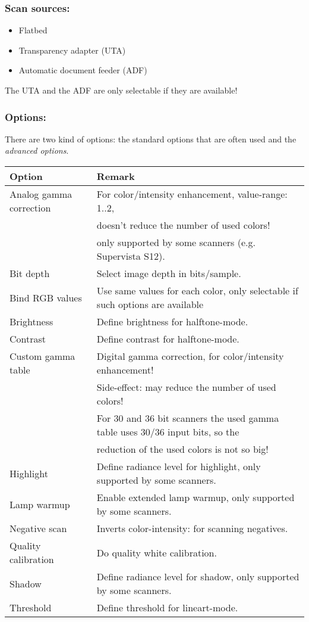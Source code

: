 \subsubsection{Scan sources:}

\begin{itemize}
\item Flatbed
\item Transparency adapter (UTA)
\item Automatic document feeder (ADF)
\end{itemize}
The UTA and the ADF are only selectable if they are available!


\subsubsection{Options:}

There are two kind of options: the standard options that are often used
and the \emph{advanced options}.\\

 \begin{figure}[h]
   \centerline{ \epsfxsize=5cm }
 \end{figure}

\small
\begin{tabular}{|l|l|}
\hline
Option&Remark\\
\hline
\hline
Analog gamma correction&For color/intensity enhancement, value-range: 1..2,\\
&doesn't reduce the number of used colors!\\
&only supported by some scanners (e.g. Supervista S12).\\
\hline
Bit depth&Select image depth in bits/sample.\\
\hline
Bind RGB values&Use same values for each color, only selectable if such options are available\\
\hline
Brightness&Define brightness for halftone-mode.\\
\hline
Contrast&Define contrast for halftone-mode.\\
\hline
Custom gamma table&Digital gamma correction, for color/intensity enhancement!\\
&Side-effect: may reduce the number of used colors!\\
&For 30 and 36 bit scanners the used gamma table uses 30/36 input bits, so the\\
&reduction of the used colors is not so big!\\
\hline
Highlight&Define radiance level for highlight, only supported by some scanners.\\
\hline
Lamp warmup&Enable extended lamp warmup, only supported by some scanners.\\
\hline
Negative scan&Inverts color-intensity: for scanning negatives.\\
\hline
Quality calibration&Do quality white calibration.\\
\hline
Shadow&Define radiance level for shadow, only supported by some scanners.\\
\hline
Threshold&Define threshold for lineart-mode.\\
\hline
\end{tabular}
\normalsize

